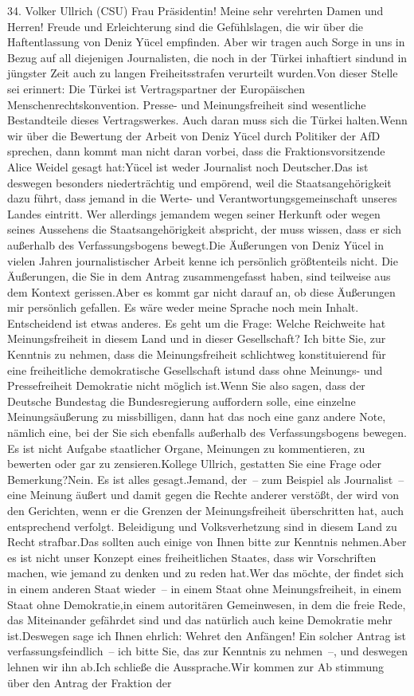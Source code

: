 \documentclass{article}
\begin{document}
	34. Volker Ullrich (CSU) Frau Präsidentin! Meine sehr verehrten Damen und Herren! Freude und Erleichterung sind die Gefühlslagen, die wir über die Haftentlassung von Deniz Yücel empfinden. Aber wir tragen auch Sorge in uns in Bezug auf all diejenigen Journalisten, die noch in der Türkei inhaftiert sindund in jüngster Zeit auch zu langen Freiheitsstrafen verurteilt wurden.Von dieser Stelle sei erinnert: Die Türkei ist Vertragspartner der Europäischen Menschenrechtskonvention. Presse- und Meinungsfreiheit sind wesentliche Bestandteile dieses Vertragswerkes. Auch daran muss sich die Türkei halten.Wenn wir über die Bewertung der Arbeit von Deniz Yücel durch Politiker der AfD sprechen, dann kommt man nicht daran vorbei, dass die Fraktionsvorsitzende Alice Weidel gesagt hat:Yücel ist weder Journalist noch Deutscher.Das ist deswegen besonders niederträchtig und empörend, weil die Staatsangehörigkeit dazu führt, dass jemand in die Werte- und Verantwortungsgemeinschaft unseres Landes eintritt. Wer allerdings jemandem wegen seiner Herkunft oder wegen seines Aussehens die Staatsangehörigkeit abspricht, der muss wissen, dass er sich außerhalb des Verfassungsbogens bewegt.Die Äußerungen von Deniz Yücel in vielen Jahren journalistischer Arbeit kenne ich persönlich größtenteils nicht. Die Äußerungen, die Sie in dem Antrag zusammengefasst haben, sind teilweise aus dem Kontext gerissen.Aber es kommt gar nicht darauf an, ob diese Äußerungen mir persönlich gefallen. Es wäre weder meine Sprache noch mein Inhalt. Entscheidend ist etwas anderes. Es geht um die Frage: Welche Reichweite hat Meinungsfreiheit in diesem Land und in dieser Gesellschaft? Ich bitte Sie, zur Kenntnis zu nehmen, dass die Meinungsfreiheit schlichtweg konstituierend für eine freiheitliche demokratische Gesellschaft istund dass ohne Meinungs- und Pressefreiheit Demokratie nicht möglich ist.Wenn Sie also sagen, dass der Deutsche Bundestag die Bundesregierung auffordern solle, eine einzelne Meinungsäußerung zu missbilligen, dann hat das noch eine ganz andere Note, nämlich eine, bei der Sie sich ebenfalls außerhalb des Verfassungsbogens bewegen. Es ist nicht Aufgabe staatlicher Organe, Meinungen zu kommentieren, zu bewerten oder gar zu zensieren.Kollege Ullrich, gestatten Sie eine Frage oder Bemerkung?Nein. Es ist alles gesagt.Jemand, der – zum Beispiel als Journalist – eine Meinung äußert und damit gegen die Rechte anderer verstößt, der wird von den Gerichten, wenn er die Grenzen der Meinungsfreiheit überschritten hat, auch entsprechend verfolgt. Beleidigung und Volksverhetzung sind in diesem Land zu Recht strafbar.Das sollten auch einige von Ihnen bitte zur Kenntnis nehmen.Aber es ist nicht unser Konzept eines freiheitlichen Staates, dass wir Vorschriften machen, wie jemand zu denken und zu reden hat.Wer das möchte, der findet sich in einem anderen Staat wieder – in einem Staat ohne Meinungsfreiheit, in einem Staat ohne Demokratie,in einem autoritären Gemeinwesen, in dem die freie Rede, das Miteinander gefährdet sind und das natürlich auch keine Demokratie mehr ist.Deswegen sage ich Ihnen ehrlich: Wehret den Anfängen! Ein solcher Antrag ist verfassungsfeindlich – ich bitte Sie, das zur Kenntnis zu nehmen –, und deswegen lehnen wir ihn ab.Ich schließe die Aussprache.Wir kommen zur Ab stimmung über den Antrag der Fraktion der 
\end{document}
